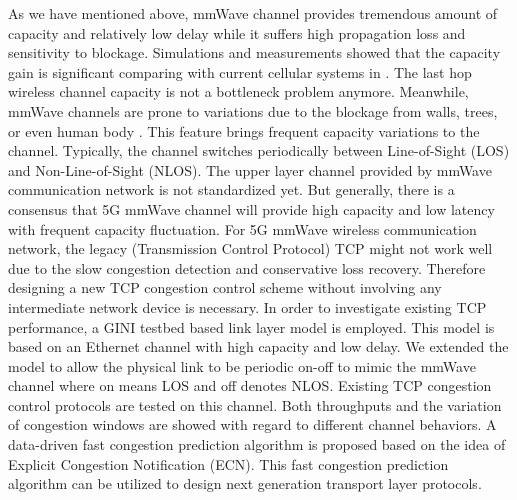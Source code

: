\par As we have mentioned above, mmWave channel provides tremendous amount of capacity and relatively low delay while it suffers high propagation loss and sensitivity to blockage. Simulations and measurements showed that the capacity gain is significant comparing with current cellular systems in \cite{akdeniz2014millimeter,bai2015coverage}. The last hop wireless channel capacity is not a bottleneck problem anymore. Meanwhile, mmWave channels are prone to variations due to the blockage from walls, trees, or even human body \cite{lu2012modeling, zhao201328, alejos2008measurement}. This feature brings frequent capacity variations to the channel. Typically, the channel switches periodically between Line-of-Sight (LOS) and Non-Line-of-Sight (NLOS). The upper layer channel provided by mmWave communication network is not standardized yet. But generally, there is a consensus that 5G mmWave channel will provide high capacity and low latency with frequent capacity fluctuation. For 5G mmWave wireless communication network, the legacy (Transmission Control Protocol) TCP might not work well due to the slow congestion detection and conservative loss recovery. Therefore designing a new TCP congestion control scheme without involving any intermediate network device is necessary. In order to investigate existing TCP performance, a GINI testbed based link layer model is employed. This model is based on an Ethernet channel with high capacity and low delay. We extended the model to allow the physical link to be periodic on-off to mimic the mmWave channel where on means LOS and off denotes NLOS. Existing TCP congestion control protocols are tested on this channel. Both throughputs and the variation of congestion windows are showed with regard to different channel behaviors. A data-driven fast congestion prediction algorithm is proposed based on the idea of Explicit Congestion Notification (ECN). This fast congestion prediction algorithm can be utilized to design next generation transport layer protocols.
